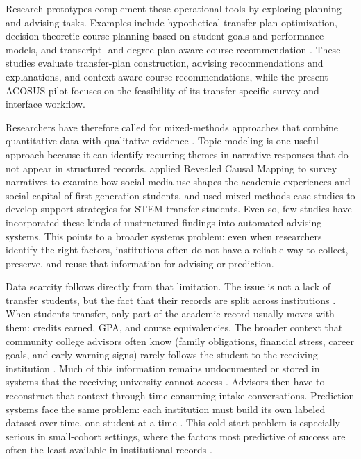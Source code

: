 \documentclass[letterpaper,11pt]{article}
\begin{document}
Research prototypes complement these operational tools by exploring planning and advising tasks. Examples include hypothetical transfer-plan optimization, decision-theoretic course planning based on student goals and performance models, and transcript- and degree-plan-aware course recommendation \parencites[pp.~3, 5, 12, 19]{nguyen2024optimal}[pp.~1, 4]{mattei2014advising}[pp.~1, 4--6]{mi2025smartcourse}. These studies evaluate transfer-plan construction, advising recommendations and explanations, and context-aware course recommendations, while the present ACOSUS pilot focuses on the feasibility of its transfer-specific survey and interface workflow.

Researchers have therefore called for mixed-methods approaches that combine quantitative data with qualitative evidence \parencite{nguyen2025school}. Topic modeling is one useful approach because it can identify recurring themes in narrative responses that do not appear in structured records. \textcite{deng2021} applied Revealed Causal Mapping to survey narratives to examine how social media use shapes the academic experiences and social capital of first-generation students, and \textcite{thiry2023} used mixed-methods case studies to develop support strategies for STEM transfer students. Even so, few studies have incorporated these kinds of unstructured findings into automated advising systems. This points to a broader systems problem: even when researchers identify the right factors, institutions often do not have a reliable way to collect, preserve, and reuse that information for advising or prediction.

Data scarcity follows directly from that limitation. The issue is not a lack of transfer students, but the fact that their records are split across institutions \parencite{roksa2008credits}. When students transfer, only part of the academic record usually moves with them: credits earned, GPA, and course equivalencies. The broader context that community college advisors often know (family obligations, financial stress, career goals, and early warning signs) rarely follows the student to the receiving institution \parencite{nguyen2024community}. Much of this information remains undocumented or stored in systems that the receiving university cannot access \parencite{preposttransfer2014}. Advisors then have to reconstruct that context through time-consuming intake conversations. Prediction systems face the same problem: each institution must build its own labeled dataset over time, one student at a time \parencite{coleman2019coldstart}. This cold-start problem is especially serious in small-cohort settings, where the factors most predictive of success are often the least available in institutional records \parencite{coleman2019coldstart}.
\end{document}
